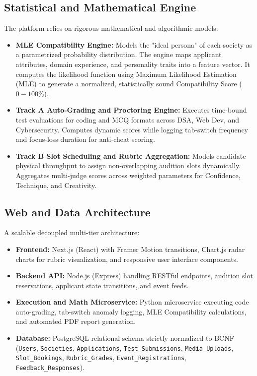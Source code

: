 \documentclass[11pt,a4paper]{article}
\begin{document}
\subsection{Statistical and Mathematical Engine}
The platform relies on rigorous mathematical and algorithmic models:
\begin{itemize}[leftmargin=0.7cm]
    \item \textbf{MLE Compatibility Engine:} Models the "ideal persona" of each society as a parametrized probability distribution. The engine maps applicant attributes, domain experience, and personality traits into a feature vector. It computes the likelihood function using Maximum Likelihood Estimation (MLE) to generate a normalized, statistically sound Compatibility Score ($0 - 100\%$).
    \item \textbf{Track A Auto-Grading and Proctoring Engine:} Executes time-bound test evaluations for coding and MCQ formats across DSA, Web Dev, and Cybersecurity. Computes dynamic scores while logging tab-switch frequency and focus-loss duration for anti-cheat scoring.
    \item \textbf{Track B Slot Scheduling and Rubric Aggregation:} Models candidate physical throughput to assign non-overlapping audition slots dynamically. Aggregates multi-judge scores across weighted parameters for Confidence, Technique, and Creativity.
\end{itemize}

\subsection{Web and Data Architecture}
A scalable decoupled multi-tier architecture:
\begin{itemize}[leftmargin=0.7cm]
    \item \textbf{Frontend:} Next.js (React) with Framer Motion transitions, Chart.js radar charts for rubric visualization, and responsive user interface components.
    \item \textbf{Backend API:} Node.js (Express) handling RESTful endpoints, audition slot reservations, applicant state transitions, and event feeds.
    \item \textbf{Execution and Math Microservice:} Python microservice executing code auto-grading, tab-switch anomaly logging, MLE Compatibility calculations, and automated PDF report generation.
    \item \textbf{Database:} PostgreSQL relational schema strictly normalized to BCNF (\texttt{Users}, \texttt{Societies}, \texttt{Applications}, \texttt{Test\_Submissions}, \texttt{Media\_Uploads}, \texttt{Slot\_Bookings}, \texttt{Rubric\_Grades}, \texttt{Event\_Registrations}, \texttt{Feedback\_Responses}).
\end{itemize}
\end{document}
